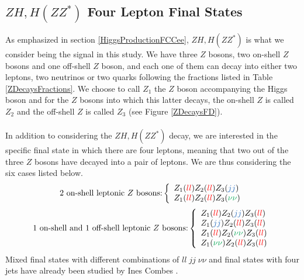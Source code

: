 \documentclass[a4paper,11pt]{article}
\begin{document}
	\subsection[$ZH,H(ZZ^*)$ Four Lepton Final States]{\boldmath$ZH,H(ZZ^*)$ Four Lepton Final States} \label{DecayChannels}
    As emphasized in section \ref{HiggsProductionFCCee}, $ZH,H(ZZ^*)$ is what we consider being the signal in this study. We have three $Z$ bosons, two on-shell $Z$ bosons and one off-shell $Z$ boson, and each one of them can decay into either two leptons, two neutrinos or two quarks following the fractions listed in Table \ref{ZDecaysFractions}. We choose to call $Z_1$ the $Z$ boson accompanying the Higgs boson and for the $Z$ bosons into which this latter decays, the on-shell $Z$ is called $Z_2$ and the off-shell $Z$ is called $Z_3$ (see Figure \ref{ZDecaysFD}).\\\\
    In addition to considering the $ZH,H(ZZ^*)$ decay, we are interested in the specific final state in which there are four leptons, meaning that two out of the three $Z$ bosons have decayed into a pair of leptons. We are thus considering the six cases listed below.
    \begin{equation}
        \mbox{2 on-shell leptonic $Z$ bosons:} \left\{
        \begin{array}{ll}
            Z_1(\textcolor{red}{ll})Z_2(\textcolor{red}{ll})Z_3(\textcolor{NavyBlue}{jj}) \\
            Z_1(\textcolor{red}{ll})Z_2(\textcolor{red}{ll})Z_3(\textcolor{Green}{\nu\nu}) 
        \end{array}
        \right.
        \label{2OnShell}
    \end{equation}
    \begin{equation}
        \mbox{1 on-shell and 1 off-shell leptonic $Z$ bosons:} \left\{
        \begin{array}{ll}
            Z_1(\textcolor{red}{ll})Z_2(\textcolor{NavyBlue}{jj})Z_3(\textcolor{red}{ll}) \\
            Z_1(\textcolor{NavyBlue}{jj})Z_2(\textcolor{red}{ll})Z_3(\textcolor{red}{ll}) \\
            Z_1(\textcolor{red}{ll})Z_2(\textcolor{Green}{\nu\nu})Z_3(\textcolor{red}{ll}) \\
            Z_1(\textcolor{Green}{\nu\nu})Z_2(\textcolor{red}{ll})Z_3(\textcolor{red}{ll})
        \end{array}
        \right.
        \label{1OnShell1OffShell}
    \end{equation}
    Mixed final states with different combinations of $ll\;jj\;\nu\nu$ and final states with four jets have already been studied by Ines Combes \cite{InesCombes2023}.
    
\end{document}
